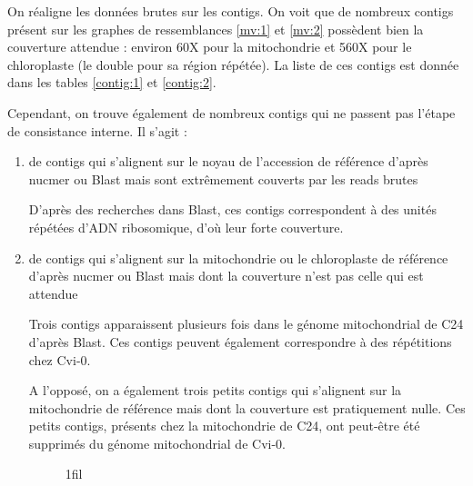 \documentclass[a4paper]{article}
\makeatletter
\newcommand*{\centerfloat}{%
  \parindent \z@
  \leftskip \z@ \@plus 1fil \@minus \textwidth
  \rightskip\leftskip
  \parfillskip \z@skip}
\makeatother
\begin{document}
On réaligne les données brutes sur les contigs. On voit que de nombreux contigs présent sur les graphes de ressemblances \ref{mv:1} et \ref{mv:2} possèdent bien la couverture attendue : environ 60X pour la mitochondrie et 560X pour le chloroplaste (le double pour sa région répétée). La liste de ces contigs est donnée dans les tables \ref{contig:1} et \ref{contig:2}. 

Cependant, on trouve également de nombreux contigs qui ne passent pas l'étape de consistance interne. Il s'agit : 
\begin{enumerate}
	\item de contigs qui s'alignent sur le noyau de l'accession de référence d'après nucmer ou Blast mais sont extrêmement couverts par les reads brutes 

D'après des recherches dans Blast, ces contigs correspondent à des unités répétées d'ADN ribosomique, d'où leur forte couverture.

\item de contigs qui s'alignent sur la mitochondrie ou le chloroplaste de référence d'après nucmer ou Blast mais dont la couverture n'est pas celle qui est attendue

Trois contigs apparaissent plusieurs fois dans le génome mitochondrial de C24 d'après Blast. Ces contigs peuvent également correspondre à des répétitions chez Cvi-0. 

A l'opposé, on a également trois petits contigs qui s'alignent sur la mitochondrie de référence mais dont la couverture est pratiquement nulle. Ces petits contigs, présents chez la mitochondrie de C24, ont peut-être été supprimés du génome mitochondrial de Cvi-0.

\begin{figure}[H]


\centerfloat


\end{figure}
\end{enumerate}
\end{document}
